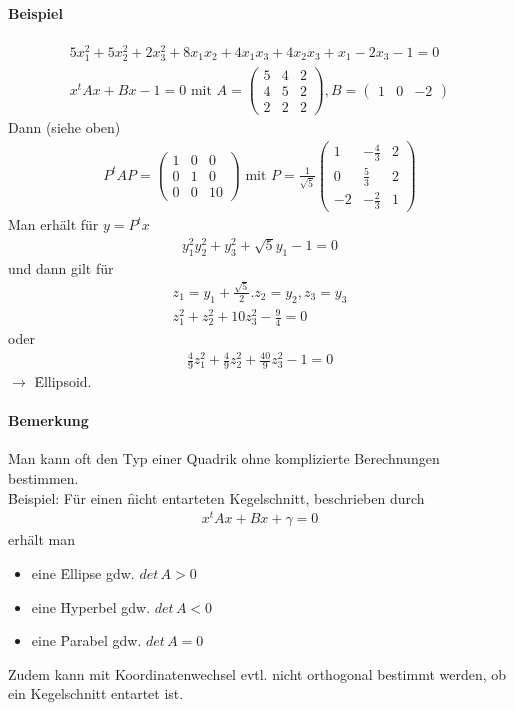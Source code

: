 \paragraph{Beispiel}
\begin{align}
5x_1^2 + 5x_2^2 + 2x_3^2 + 8x_1 x_2 + 4x_1 x_3 + 4x_2 x_3 + x_1 - 2x_3 -1 = 0 \\
x^t A x + Bx -1 = 0 \text{ mit } A = \begin{pmatrix}5 & 4 & 2 \\ 4 & 5 & 2 \\ 2 & 2 & 2 \end{pmatrix}, B = \begin{pmatrix} 1 & 0 & -2\end{pmatrix}
\end{align}
Dann (siehe oben)
\begin{align}
P^t A P = \begin{pmatrix} 1 & 0 & 0 \\ 0 & 1 & 0 \\ 0 & 0 & 10 \end{pmatrix} \text{ mit } P = \frac{1}{\sqrt{5}} \begin{pmatrix} 1 & -\frac{4}{3} & 2 \\ 0 & \frac{5}{3} & 2 \\ -2 & -\frac{2}{3} & 1 \end{pmatrix}
\end{align}
Man erhält für $y = P^t x$
\begin{align}
y_1^2 y_2^2 + y_3^2 + \sqrt{5} y_1 -1 = 0
\end{align}
und dann gilt für 
\begin{align}
z_1 = y_1 + \frac{\sqrt{5}}{2}. z_2 = y_2, z_3 = y_3 \\
z_1^2 + z_2^2 + 10z_3^2 - \frac{9}{4} = 0 
\end{align}
oder 
\begin{align}
\frac{4}{9}z_1^2 + \frac{4}{9} z_2^2 + \frac{40}{9} z_3^2 -1 = 0
\end{align}
$\rightarrow$ \f{Ellipsoid}.

\paragraph{Bemerkung}
Man kann oft den Typ einer Quadrik ohne komplizierte Berechnungen bestimmen.\\
\f{Beispiel}: Für einen \f{nicht entarteten} Kegelschnitt, beschrieben durch
\begin{align}
x^t Ax + Bx + \gamma = 0
\end{align}
erhält man 
\begin{itemize}
\item eine \f{Ellipse} gdw. $det\, A > 0$
\item eine \f{Hyperbel} gdw. $det\, A < 0$
\item eine \f{Parabel} gdw. $det\, A = 0$ 
\end{itemize}
Zudem kann mit Koordinatenwechsel evtl. nicht orthogonal bestimmt werden, ob ein Kegelschnitt entartet ist.

